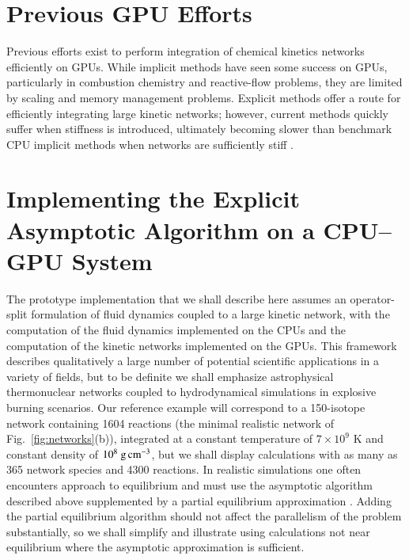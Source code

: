 \documentclass[]{elsart}
\newcommand{\fig}[1]{Fig.~\ref{fig:#1}}
\newcommand{\units}[1]{\mbox{\ #1}}
\begin{document}
\section{Previous GPU Efforts}
Previous efforts exist to perform integration of chemical kinetics networks
efficiently on GPUs.  While implicit methods have seen some success on GPUs,
particularly in combustion chemistry and reactive-flow problems, they are
limited by scaling and memory management problems\cite{le, shi1, sewerin}.
Explicit methods offer a route for efficiently integrating large kinetic
networks; however, current methods quickly suffer when stiffness is
introduced, ultimately becoming slower than benchmark CPU implicit methods
when networks are sufficiently stiff \cite{niemeyer, shi2, stone}.

\section{Implementing the Explicit Asymptotic Algorithm on a CPU--GPU 
System}

The prototype implementation that we shall describe here assumes an 
operator-split formulation of fluid dynamics coupled to a large kinetic network, 
with the computation of the fluid dynamics implemented on the CPUs and the 
computation of the kinetic networks implemented on the GPUs. This framework 
describes qualitatively a large number of potential scientific applications in a 
variety of fields, but to be definite we shall emphasize  astrophysical 
thermonuclear networks coupled to hydrodynamical simulations in explosive 
burning scenarios. Our reference example will correspond to a 150-isotope 
network containing 1604 reactions (the minimal realistic network of 
\fig{networks}(b)),  integrated at a constant temperature of $7 \times 10^9$ K 
and constant density of $10^8 \units{g\,cm}^{-3}$, but we shall display 
calculations with as many as 365 network species and 4300 reactions.  In 
realistic simulations one often encounters approach to equilibrium and must use 
the asymptotic algorithm described above supplemented by a partial equilibrium 
approximation \cite{guidJCP,guidPE}. Adding the partial equilibrium algorithm 
should not affect the parallelism of the problem substantially, so we shall 
simplify and illustrate using calculations not near equilibrium where the 
asymptotic approximation is sufficient.
\end{document}
